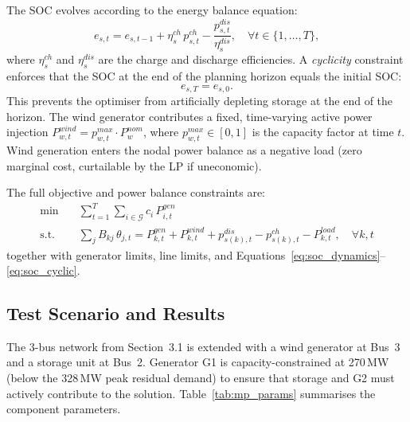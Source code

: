 The SOC evolves according to the energy balance equation:
\begin{equation}
    e_{s,t} = e_{s,t-1} + \eta_s^{ch}\,p_{s,t}^{ch} - \frac{p_{s,t}^{dis}}{\eta_s^{dis}},
    \quad \forall t \in \{1,\ldots,T\},
    \label{eq:soc_dynamics}
\end{equation}
where $\eta_s^{ch}$ and $\eta_s^{dis}$ are the charge and discharge efficiencies. A \emph{cyclicity} constraint enforces that the SOC at the end of the planning horizon equals the initial SOC:
\begin{equation}
    e_{s,T} = e_{s,0}.
    \label{eq:soc_cyclic}
\end{equation}
This prevents the optimiser from artificially depleting storage at the end of the horizon. The wind generator contributes a fixed, time-varying active power injection $P_{w,t}^{wind} = p_{w,t}^{max} \cdot P_w^{nom}$, where $p_{w,t}^{max} \in [0,1]$ is the capacity factor at time $t$. Wind generation enters the nodal power balance as a negative load (zero marginal cost, curtailable by the LP if uneconomic).

The full objective and power balance constraints are:
\begin{align}
    \min \quad & \sum_{t=1}^{T} \sum_{i \in \mathcal{G}} c_i\,P_{i,t}^{gen}
    \label{eq:mp_obj} \\
    \text{s.t.} \quad
    & \sum_{j} B_{kj}\,\theta_{j,t} = P_{k,t}^{gen} + P_{k,t}^{wind}
      + p_{s(k),t}^{dis} - p_{s(k),t}^{ch} - P_{k,t}^{load},
      \quad \forall k,t \label{eq:mp_balance}
\end{align}
together with generator limits, line limits, and Equations~\eqref{eq:soc_dynamics}--\eqref{eq:soc_cyclic}.

\subsection{Test Scenario and Results}

The 3-bus network from Section~3.1 is extended with a wind generator at Bus~3 and a storage unit at Bus~2. Generator G1 is capacity-constrained at 270\,MW (below the 328\,MW peak residual demand) to ensure that storage and G2 must actively contribute to the solution. Table~\ref{tab:mp_params} summarises the component parameters.

